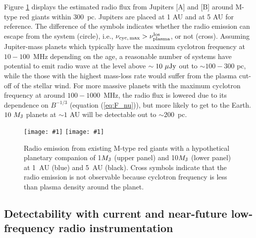 \documentclass[iop,numberedappendix,apj]{emulateapj}
\def\plotoneh#1{\centering \leavevmode
\texttt{[image: \#1]}}
\begin{document}
Figure \ref{fig:observability} displays the estimated radio flux from Jupiters [A] and [B] around M-type red giants within 300~pc. 
Jupiters are placed at 1 AU and at 5 AU for reference. 
The difference of the symbols indicates whether the radio emission can escape from the system (circle), i.e., $\nu _{\rm cyc,\,max} > \nu_{\rm plasma}^{\rm los}$,  or not (cross). 
Assuming Jupiter-mass planets which typically have the maximum cyclotron frequency at $10-100$~MHz depending on the age, a reasonable number of systems have potential to emit radio wave at the level above $\sim 10~\mu {\rm Jy}$  out to $\sim 100-300$ pc, while the those with the highest mass-loss rate would suffer from the plasma cut-off of the stellar wind. 
For more massive planets with the maximum cyclotron frequency at around $100-1000$~MHz, the radio flux is lowered due to its dependence on $B^{-1/3}$ (equation (\ref{eq:F_nu})), but more likely to get to the Earth. $10~M_{\rm J}$ planets at $\sim 1$ AU will be detectable out to $\sim 200$~pc.


\begin{figure}[tbhp]
   \plotoneh{radio_M-RG_1Mp.pdf}
   \plotoneh{radio_M-RG_10Mp.pdf}
   \caption{Radio emission from existing M-type red giants with a hypothetical planetary companion of 1$M_{\rm J}$ (upper panel) and 10$M_{\rm J}$ (lower panel) at 1~AU (blue) and 5~AU (black).
Cross symbols indicate that the radio emission is not observable because cyclotron frequency is less than plasma density around the planet. }
  \label{fig:observability}
\end{figure}


\subsection{Detectability with current and near-future low-frequency radio instrumentation}
\label{ss:detectability}
\end{document}

